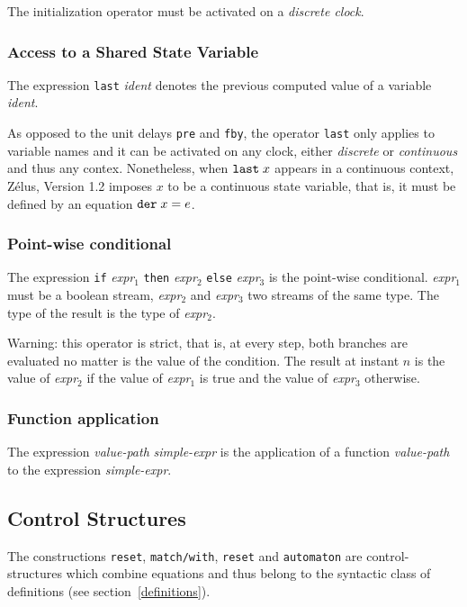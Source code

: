 \documentclass[11pt,titlepage,twoside]{report}
\newcommand{\zelus}{{\sf Z\'elus}}
\newcommand{\If}{\mbox{{\tt if}}}
\newcommand{\Then}{\mbox{{\tt then}}}
\newcommand{\Else}{\mbox{{\tt else}}}
\newcommand{\Pre}{\mbox{{\tt pre}}}
\newcommand{\Last}{\mbox{{\tt last}}}
\newcommand{\Fby}{\mbox{{\tt fby}}}
\newcommand{\term}[1]{{\tt #1}}
\newcommand{\nterm}[1]{{\em #1}}
\begin{document}
The initialization operator must be activated on a \emph{discrete clock}.

\subsubsection{Access to a Shared State Variable}
The expression \term{\Last} \nterm{ident} denotes the previous computed value
of a variable \nterm{ident}.

As opposed to the unit delays \term{\Pre} and \term{\Fby}, the
operator \term{\Last} only applies to variable names and it can be activated
on any clock, either \emph{discrete} or \emph{continuous} and thus
any contex. Nonetheless, when $\term{\Last}\; x$ appears in a continuous context,
\zelus, Version 1.2 imposes $x$ to be a continuous state variable, that is,
it must be defined by an equation $\term{der}\; x = e$.

\subsubsection{Point-wise conditional}
The expression \term{\If} \nterm{expr}$_1$ \term{\Then}
\nterm{expr}$_2$ \term{\Else} \nterm{expr}$_3$ is the point-wise
conditional. \nterm{expr}$_1$ must be a boolean stream,
\nterm{expr}$_2$ and \nterm{expr}$_3$ two streams of the same
type. The type of the result is the type of \nterm{expr}$_2$.

Warning: this operator is strict, that is, at every step, both branches
are evaluated no matter is the value of the condition. The result at instant
$n$ is the value of \nterm{expr}$_2$ if the value of \nterm{expr}$_1$ is true and
the value of \nterm{expr}$_3$ otherwise.

\subsubsection{Function application}
The expression \nterm{value-path} \nterm{simple-expr} is the application
of a function \nterm{value-path} to the expression \nterm{simple-expr}.

\subsection{Control Structures}
The constructions \verb-reset-, \verb-match/with-, \verb-reset- and
\verb-automaton- are control-structures which combine equations and
thus belong to the syntactic class of definitions (see
section~\ref{definitions}).
\end{document}
